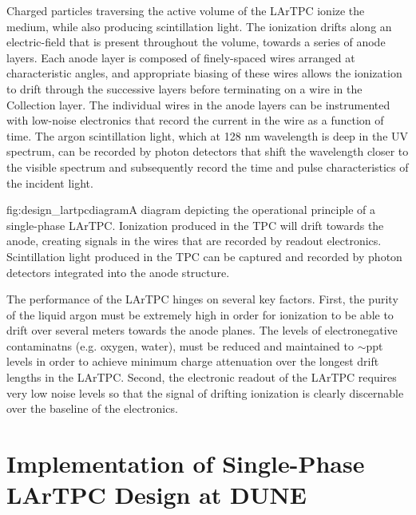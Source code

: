 Charged particles traversing the active volume of the LArTPC ionize the medium,
while also producing scintillation light.  The ionization drifts along
an electric-field that is present throughout the volume, towards a series of
anode layers.  Each anode layer is composed of finely-spaced wires arranged at
characteristic angles, and appropriate biasing of these wires allows the
ionization to drift through the successive layers before terminating on a wire
in the Collection layer.  The individual wires in the anode layers can be
instrumented with low-noise electronics that record the current in the wire as
a function of time.  The argon scintillation light, which at 128 nm wavelength
is deep in the UV spectrum, can be recorded by photon detectors that shift the
wavelength closer to the visible spectrum and subsequently record the time and
pulse characteristics of the incident light.

\begin{dunefigure}{fig:design_lartpcdiagram}{A diagram depicting the operational
    principle of a single-phase LArTPC.  Ionization produced in the TPC will
    drift towards the anode, creating signals in the wires that are recorded
    by readout electronics.  Scintillation light produced in the TPC can be
    captured and recorded by photon detectors integrated into the anode
    structure.}
\end{dunefigure}


The performance of the LArTPC hinges on several key factors.  First, the
purity of the liquid argon must be extremely high in order for ionization to
be able to drift over several meters towards the anode planes.  The levels of
electronegative contaminatns (e.g. oxygen, water), must be reduced and
maintained to $\sim$ppt levels in order to achieve minimum charge attenuation
over the longest drift lengths in the LArTPC.   Second, the electronic readout
of the LArTPC requires very low noise levels so that the signal of drifting
ionization is clearly discernable over the baseline of the electronics.  

\section{Implementation of Single-Phase LArTPC Design at DUNE}
\label{sec:fdsp-design-impl}

